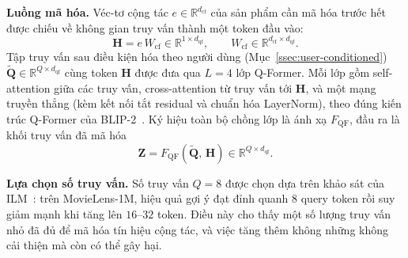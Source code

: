 \textbf{Luồng mã hóa.} Véc-tơ cộng tác $e \in \mathbb{R}^{d_{\text{cf}}}$ của sản phẩm cần mã
hóa trước hết được chiếu về không gian truy vấn thành một token đầu vào:
\begin{equation}\label{eq:cf-proj}
\mathbf{H} = e\, W_{\text{cf}} \in \mathbb{R}^{1 \times d_{\text{qf}}}, \qquad
W_{\text{cf}} \in \mathbb{R}^{d_{\text{cf}} \times d_{\text{qf}}}.
\end{equation}
Tập truy vấn sau điều kiện hóa theo người dùng (Mục~\ref{ssec:user-conditioned})
$\tilde{\mathbf{Q}} \in \mathbb{R}^{Q \times d_{\text{qf}}}$ cùng token $\mathbf{H}$ được đưa qua
$L = 4$ lớp Q-Former. Mỗi lớp gồm self-attention giữa các truy vấn, cross-attention từ truy vấn
tới $\mathbf{H}$, và một mạng truyền thẳng (kèm kết nối tắt residual và chuẩn hóa LayerNorm),
theo đúng kiến trúc Q-Former của BLIP-2~\cite{blip2_2023}. Ký hiệu toàn bộ chồng lớp là ánh xạ
$F_{\text{QF}}$, đầu ra là khối truy vấn đã mã hóa
\begin{equation}\label{eq:qf-out}
\mathbf{Z} = F_{\text{QF}}(\tilde{\mathbf{Q}},\, \mathbf{H}) \in \mathbb{R}^{Q \times d_{\text{qf}}}.
\end{equation}

\textbf{Lựa chọn số truy vấn.} Số truy vấn $Q = 8$ được chọn dựa trên khảo sát của
ILM~\cite{ilm2024}: trên MovieLens-1M, hiệu quả gợi ý đạt đỉnh quanh $8$ query token rồi suy
giảm mạnh khi tăng lên $16$--$32$ token. Điều này cho thấy một số lượng truy vấn nhỏ đã đủ để
mã hóa tín hiệu cộng tác, và việc tăng thêm không những không cải thiện mà còn có thể gây hại.

